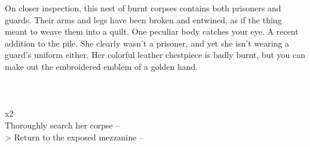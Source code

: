 On closer inspection, this nest of burnt corpses contains both prisoners and guards. Their arms and legs have been broken and entwined, as if the thing meant to weave them into a quilt. One peculiar body catches your eye. A recent addition to the pile. She clearly wasn’t a prisoner, and yet she isn't wearing a guard’s uniform either. Her colorful leather chestpiece is badly burnt, but you can make out the embroidered emblem of a golden hand.\\
\\
\\
\\
 x2\\

 Thoroughly search her corpse -- \\
> Return to the exposed mezzanine -- 